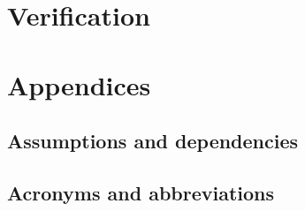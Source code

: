 \documentclass{scrreprt}
\begin{document}
\chapter{Verification}


\chapter{Appendices}
\section{Assumptions and dependencies}


\section{Acronyms and abbreviations}
\end{document}
